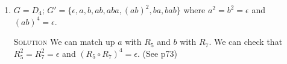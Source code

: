 \documentclass[twoside]{amsart}
\newcommand{\solution}{\textsc{Solution}\xspace}
\newcommand{\iso}{\cong}
\newcommand{\blank}{\vspace{5pt}}
\begin{document}
\begin{enumerate}[A.]
\begin{enumerate}[1]
      \blank \noindent \solution We can check that $(1,3)^2 = \epsilon$
      and $(2,3)^2 = \epsilon$ and $(1,3)(2,3)(1,3) = (2,3)(1,3)(2,3)$.
      Therefore, $G \iso G'$ because we can match up the defining
      equations for each. We can match up $a$ with $(1,3)$ and
      $b$ with $(2,3)$.

      \blank
      \item $G=D_4$; $G'=\{\epsilon, a, b, ab, aba, (ab)^2, ba, bab\}$
      where $a^2=b^2=\epsilon$ and $(ab)^4 = \epsilon$.

      \blank \noindent \solution We can match up $a$ with $R_5$ and
      $b$ with $R_7$. We can check that $R_5^2 = R_7^2 = \epsilon$ and
      $(R_5 \circ R_7)^4 = \epsilon$. (See p73)


   \end{enumerate}

\end{enumerate}
\end{document}
